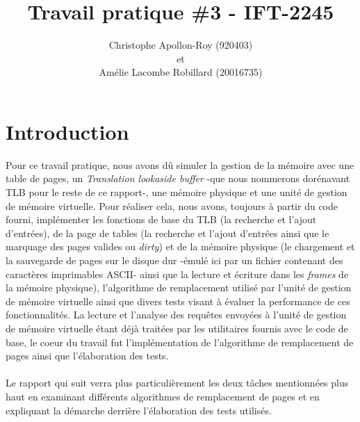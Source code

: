 \documentclass{article}
\title{Travail pratique \#3 - IFT-2245}
\author{Christophe Apollon-Roy (920403) \\et \\Amélie Lacombe Robillard (20016735)}
\begin{document}
\maketitle

\section{Introduction}
\setlength{\parindent}{20pt}
Pour ce travail pratique, nous avons dû simuler la gestion de la mémoire avec une table de pages, un \emph{Translation lookaside buffer} 
-que nous nommerons dorénavant TLB pour le reste de ce rapport-, une mémoire physique et une unité de gestion de mémoire virtuelle. Pour 
réaliser cela, nous avons, toujours à partir du code fourni, implémenter les fonctions de base du TLB (la recherche et l'ajout d'entrées), de la 
page de tables (la recherche et l'ajout d'entrées ainsi que le marquage des pages valides ou \emph{dirty}) et de la mémoire physique (le 
chargement et la sauvegarde de pages sur le disque dur -émulé ici par un fichier contenant des caractères imprimables ASCII- ainsi que 
la lecture et écriture dans les \emph{frames} de la mémoire physique), l'algorithme de remplacement utilisé par l'unité de gestion de mémoire 
virtuelle ainsi que divers tests visant à évaluer la performance de ces fonctionnalités. La lecture et l'analyse des requêtes envoyées à l'unité 
de gestion de mémoire virtuelle étant déjà traitées par les utilitaires fournis avec le code de base, le coeur du travail fut l'implémentation 
de l'algorithme de remplacement de pages ainsi que l'élaboration des tests.\\
\\
Le rapport qui suit verra plus particulièrement les deux tâches mentionnées plus haut en examinant différents algorithmes de remplacement de 
pages et en expliquant la démarche derrière l'élaboration des tests utilisés.\\
\\
\end{document}

